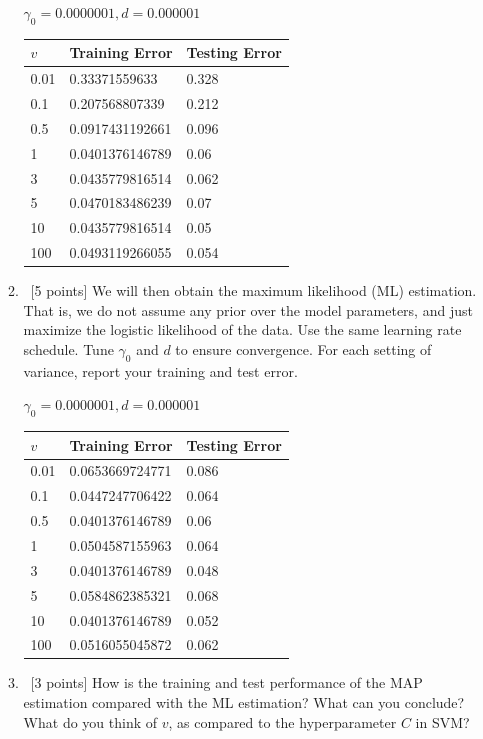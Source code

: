 \documentclass[12pt, fullpage,letterpaper]{article}
\begin{document}
\begin{enumerate}
\begin{enumerate}
		$\gamma_0 = 0.0000001, d = 0.000001$
		
		\begin{table}[h]
			\centering
			\begin{tabular}{l||ll}
				$v$ & Training Error & Testing Error \\
				\hline\hline
				0.01 & 0.33371559633 & 0.328 \\
				0.1 & 0.207568807339 & 0.212 \\
				0.5 & 0.0917431192661 & 0.096 \\
				1 & 0.0401376146789 & 0.06 \\
				3 & 0.0435779816514 & 0.062 \\
				5 & 0.0470183486239 & 0.07 \\
				10 & 0.0435779816514 & 0.05 \\
				100 & 0.0493119266055 & 0.054 \\
			\end{tabular}
		\end{table}
		 
		\item~[5 points] We will then obtain the maximum likelihood (ML) estimation. That is, we do not assume any prior over the model parameters, and just maximize the logistic likelihood of the data. Use the same learning rate schedule. Tune $\gamma_0$ and $d$ to ensure convergence. For each setting of variance, report your training and test error. 
		
		$\gamma_0 = 0.0000001, d = 0.000001$
		\begin{table}[h]
			\centering
			\begin{tabular}{l||ll}
				$v$ & Training Error & Testing Error \\
				\hline\hline
				0.01 & 0.0653669724771 & 0.086 \\
				0.1 & 0.0447247706422 & 0.064 \\
				0.5 & 0.0401376146789 & 0.06 \\
				1 & 0.0504587155963 & 0.064 \\
				3 & 0.0401376146789 & 0.048 \\
				5 & 0.0584862385321 & 0.068 \\
				10 & 0.0401376146789 & 0.052 \\
				100 & 0.0516055045872 & 0.062 \\
			\end{tabular}
		\end{table}
		
		\item~[3 points] How is the training and test performance of the MAP estimation compared with the ML estimation? What can you conclude? What do you think of $v$, as compared to  the hyperparameter $C$ in SVM?
		

\end{enumerate}
\end{enumerate}
\end{document}
